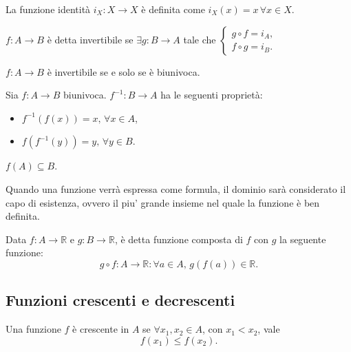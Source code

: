 \begin{definition}
    La funzione identità $i_X\colon X\rightarrow X$ è definita come $i_X(x)=x\,\forall x\in X$. 
\end{definition}

\begin{definition}\label{def:funzione_invertibile}
    $f\colon A\rightarrow B$ è detta invertibile se $\exists g\colon B\rightarrow A$ tale che
    $\begin{cases}
        g\circ f = i_A,\\
        f\circ g = i_B.
    \end{cases}$
\end{definition}

\begin{property}
    $f\colon A\rightarrow B$ è invertibile se e solo se è biunivoca.
\end{property}

\begin{property}
    Sia $f\colon A\rightarrow B$ biunivoca. $f^{-1}\colon B\rightarrow A$ ha le seguenti proprietà:
    \begin{itemize}
        \item $f^{-1}(f(x))=x,\, \forall x\in A$,
        \item $f(f^{-1}(y))=y,\, \forall y\in B$.
    \end{itemize}
\end{property}

\begin{remark}
    $f(A)\subseteq B$.
\end{remark}

Quando una funzione verrà espressa come formula, il dominio sarà considerato il capo di esistenza, ovvero il piu' grande insieme nel quale la funzione è ben definita.

\begin{definition}\label{def:funzione_composta}
    Data $f\colon A\rightarrow\mathbb R$ e $g\colon B\rightarrow \mathbb R$, è detta funzione composta di $f$ con $g$ la seguente funzione:
    \begin{equation*}
        g\circ f\colon A\rightarrow \mathbb R \colon\forall a\in A,\, g(f(a))\in\mathbb R.
    \end{equation*}
\end{definition}

\subsection{Funzioni crescenti e decrescenti}
\begin{definition}\label{def:funzione_crescente}
    Una funzione $f$ è crescente in $A$ se $\forall x_1,x_2\in A$, con $x_1<x_2$, vale
    \begin{equation*}
        f(x_1)\leq f(x_2).
    \end{equation*}
\end{definition}


